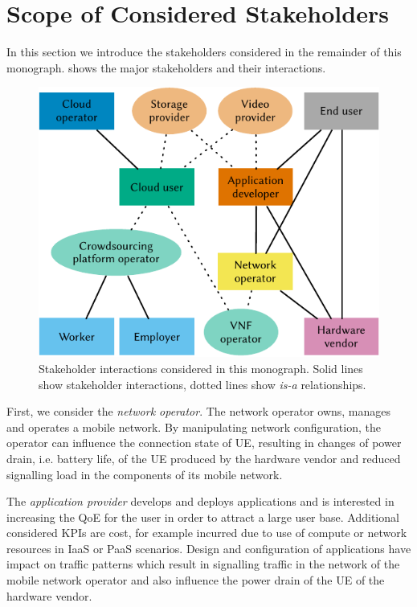 \section{Scope of Considered Stakeholders}\label{sec:introduction:considered_stakeholders}

In this section we introduce the stakeholders considered in the remainder of this monograph.
 shows the major stakeholders and their interactions.

\begin{figure}
\centering
\includegraphics{figures/stakeholders}
\caption{Stakeholder interactions considered in this monograph. Solid lines show stakeholder interactions, dotted lines show \emph{is-a} relationships.}\label{fig:introduction:stakeholders}
\end{figure}

First, we consider the \emph{network operator}.
The network operator owns, manages and operates a mobile network.
By manipulating network configuration, the operator can influence the connection state of \gls{UE}, resulting in changes of power drain, i.e. battery life, of the \gls{UE} produced by the hardware vendor and reduced signalling load in the components of its mobile network.

The \emph{application provider} develops and deploys applications and is interested in increasing the \gls{QoE} for the user in order to attract a large user base.
Additional considered \glspl{KPI} are cost, for example incurred due to use of compute or network resources in \gls{IaaS} or \gls{PaaS} scenarios.
Design and configuration of applications have impact on traffic patterns which result in signalling traffic in the network of the mobile network operator and also influence the power drain of the \gls{UE} of the hardware vendor.

